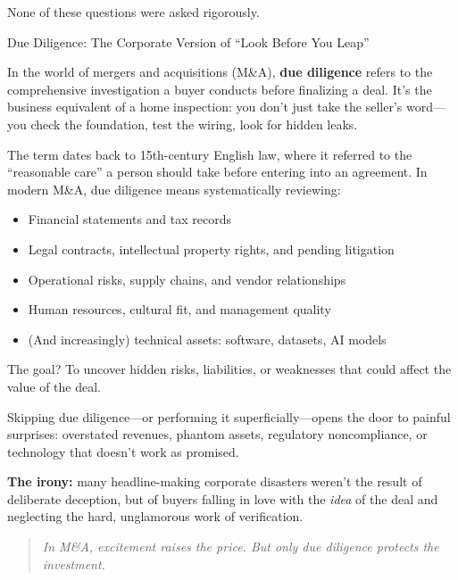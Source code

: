 None of these questions were asked rigorously.

\begin{HistoricalSidebar}{Due Diligence: The Corporate Version of ``Look Before You Leap''}

    In the world of mergers and acquisitions (M\&A), \textbf{due diligence} refers to the comprehensive investigation a buyer conducts before finalizing a deal.  
    It’s the business equivalent of a home inspection:  
    you don’t just take the seller’s word—you check the foundation, test the wiring, look for hidden leaks.
    
    \medskip
    
    The term dates back to 15th-century English law, where it referred to the ``reasonable care'' a person should take before entering into an agreement.  
    In modern M\&A, due diligence means systematically reviewing:
    
    \begin{itemize}
        \item Financial statements and tax records
        \item Legal contracts, intellectual property rights, and pending litigation
        \item Operational risks, supply chains, and vendor relationships
        \item Human resources, cultural fit, and management quality
        \item (And increasingly) technical assets: software, datasets, AI models
    \end{itemize}
    
    \medskip
    
    The goal? To uncover hidden risks, liabilities, or weaknesses that could affect the value of the deal.
    
    \medskip
    
    Skipping due diligence—or performing it superficially—opens the door to painful surprises:  
    overstated revenues, phantom assets, regulatory noncompliance, or technology that doesn’t work as promised.
    
    \medskip
    
    \textbf{The irony:} many headline-making corporate disasters weren’t the result of deliberate deception, but of buyers falling in love with the \textit{idea} of the deal and neglecting the hard, unglamorous work of verification.
    
    \medskip
    
    \begin{quote}
    \textit{In M\&A, excitement raises the price.  
    But only due diligence protects the investment.}
    \end{quote}
    
\end{HistoricalSidebar}

